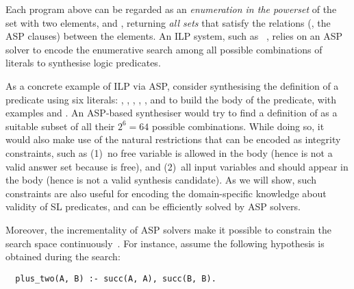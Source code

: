 Each program above can be regarded as an \emph{enumeration in the
  powerset} of the set with two elements,  and ,
returning \emph{all sets} that satisfy the relations (\ie, the ASP
clauses) between the elements.
%
An ILP system, such as \popper~\cite{cropper2021learning}, relies on
an ASP solver to encode the enumerative search among all possible
combinations of literals to synthesise logic predicates.

As a concrete example of ILP via ASP, consider synthesising the
definition of a predicate  using six literals:
, , ,
, , and  to
build the body of the predicate, with examples 
and .
%
An ASP-based synthesiser would try to find a definition of
 as a suitable subset of all their $2^6=64$
possible combinations.
%
While doing so, it would also make use of the natural restrictions
that can be encoded as integrity constraints, such as
%
(1)~no free variable is allowed in the body (hence  is
not a valid answer set because  is free), and 
%
(2)~all input variables  and  should appear in the
body (hence  is not a valid synthesis candidate).
%
As we will show, such constraints are also useful for encoding the
domain-specific knowledge about validity of SL predicates, and can be
efficiently solved by ASP solvers.
%

Moreover, the incrementality of ASP solvers make it possible to
constrain the search space continuously~\cite{gebser2019multi}. For
instance, assume the following hypothesis is obtained during the
search:
%
\begin{verbatim}
  plus_two(A, B) :- succ(A, A), succ(B, B).
\end{verbatim}
%


